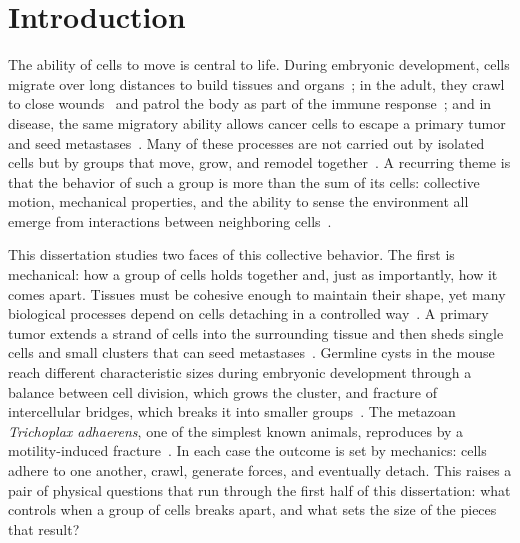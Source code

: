 \chapter{Introduction} \label{chap:introduction}


The ability of cells to move is central to life.
During embryonic development, cells migrate over long distances to build tissues and organs~\cite{scarpa2016collective, weijer2009collective}; in the adult, they crawl to close wounds~\cite{poujade2007collective} and patrol the body as part of the immune response~\cite{trepat2012cell}; and in disease, the same migratory ability allows cancer cells to escape a primary tumor and seed metastases~\cite{haeger2014cell, cheung2016collective}.
Many of these processes are not carried out by isolated cells but by groups that move, grow, and remodel together~\cite{cheung2025collective, friedl2009collective, rorth2009collective}.
A recurring theme is that the behavior of such a group is more than the sum of its cells: collective motion, mechanical properties, and the ability to sense the environment all emerge from interactions between neighboring cells~\cite{alert2020physical, hakim2017collective}.

This dissertation studies two faces of this collective behavior.
The first is mechanical: how a group of cells holds together and, just as importantly, how it comes apart.
Tissues must be cohesive enough to maintain their shape, yet many biological processes depend on cells detaching in a controlled way~\cite{friedl2009collective, cheung2025collective}.
A primary tumor extends a strand of cells into the surrounding tissue and then sheds single cells and small clusters that can seed metastases~\cite{cheung2016collective, haeger2014cell}.
Germline cysts in the mouse reach different characteristic sizes during embryonic development through a balance between cell division, which grows the cluster, and fracture of intercellular bridges, which breaks it into smaller groups~\cite{levy2024tug}.
The metazoan \textit{Trichoplax adhaerens}, one of the simplest known animals, reproduces by a motility-induced fracture~\cite{prakash2021motility}.
In each case the outcome is set by mechanics: cells adhere to one another, crawl, generate forces, and eventually detach.
This raises a pair of physical questions that run through the first half of this dissertation: what controls when a group of cells breaks apart, and what sets the size of the pieces that result?

